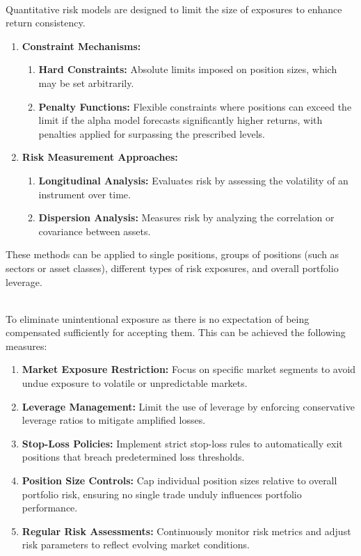 \begin{method} \\
Quantitative risk models are designed to limit the size of exposures to enhance return consistency.
\begin{enumerate}[label=\roman*.]
	\setlength{\itemsep}{0pt}
    \item \textbf{Constraint Mechanisms:}
        \begin{enumerate}[label=\alph*.]
            \item \textbf{Hard Constraints:} Absolute limits imposed on position sizes, which may be set arbitrarily.
            \item \textbf{Penalty Functions:} Flexible constraints where positions can exceed the limit if the alpha model forecasts significantly higher returns, with penalties applied for surpassing the prescribed levels.
        \end{enumerate}
    \item \textbf{Risk Measurement Approaches:}
        \begin{enumerate}[label=\alph*.]
            \item \textbf{Longitudinal Analysis:} Evaluates risk by assessing the volatility of an instrument over time.
            \item \textbf{Dispersion Analysis:} Measures risk by analyzing the correlation or covariance between assets.
        \end{enumerate}
\end{enumerate}
These methods can be applied to single positions, groups of positions (such as sectors or asset classes), different types of risk exposures, and overall portfolio leverage.
\end{method}

\begin{method} \\
To eliminate unintentional exposure as there is no expectation of being compensated sufficiently for accepting them. This can be achieved the following measures:
\begin{enumerate}[label=\roman*.]
	\setlength{\itemsep}{0pt}
    \item \textbf{Market Exposure Restriction:} Focus on specific market segments to avoid undue exposure to volatile or unpredictable markets.
    \item \textbf{Leverage Management:} Limit the use of leverage by enforcing conservative leverage ratios to mitigate amplified losses.
    \item \textbf{Stop-Loss Policies:} Implement strict stop-loss rules to automatically exit positions that breach predetermined loss thresholds.
    \item \textbf{Position Size Controls:} Cap individual position sizes relative to overall portfolio risk, ensuring no single trade unduly influences portfolio performance.
    \item \textbf{Regular Risk Assessments:} Continuously monitor risk metrics and adjust risk parameters to reflect evolving market conditions.
\end{enumerate}
\end{method}
